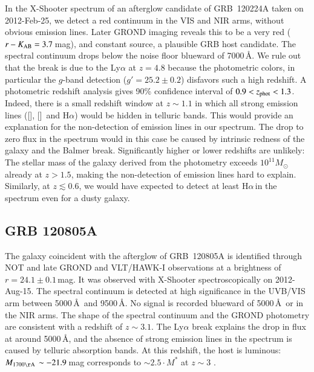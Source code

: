 \documentclass[traditabstract, longauth]{aa}
\newcommand{\ha}{H$\alpha$}
\newcommand{\oii}{[\ion{O}{ii}]}
\newcommand{\oiii}{[\ion{O}{iii}]}
\newcommand{\Msun}{$M_\odot$}
\begin{document}
\begin{appendix}
In the X-Shooter spectrum  \citep{2012GCN..12991...1W} of an afterglow candidate of GRB~120224A \citep{2012GCN..12980...1S} taken on 2012-Feb-25, we detect a red continuum in the VIS and NIR arms, without obvious emission lines. Later GROND imaging reveals this to be a very red ($r-K_{\rm{AB}}=3.7$\,mag), and constant source, a plausible GRB host candidate. The spectral continuum drops below the noise floor blueward of 7000\,\AA. We rule out that the break is due to the Ly$\alpha$ at $z=4.8$ because the photometric colors, in particular the $g$-band detection ($g'=25.2\pm0.2$) disfavors such a high redshift. A photometric redshift analysis gives 90\% confidence interval of $0.9 < z_{\rm{phot}} < 1.3$. Indeed, there is a small redshift window at $z\sim1.1$ in which all strong emission lines (\oii, \oiii\, and \ha) would be hidden in telluric bands. This would provide an explanation for the non-detection of emission lines in our spectrum. The drop to zero flux in the spectrum would in this case be caused by intrinsic redness of the galaxy and the Balmer break. Significantly higher or lower redshifts are unlikely: The stellar mass of the galaxy derived from the photometry exceeds $10^{11}$\Msun\,already at $z > 1.5$, making the non-detection of emission lines hard to explain. Similarly, at $z \lesssim 0.6$, we would have expected to detect at least \ha\,in the spectrum even for a dusty galaxy.

\subsection{GRB 120805A}

The galaxy coincident with the afterglow \citep{2012GCN..13651...1G, 2012GCN..13591...1G} of GRB~120805A \citep{2012GCN..13588...1T} is identified through NOT \citep{2012GCN..13639...1M} and late GROND and VLT/HAWK-I observations at a brightness of $r=24.1\pm0.1$\,mag. It was observed with X-Shooter spectroscopically on 2012-Aug-15. The spectral continuum is detected at high significance in the UVB/VIS arm between 5000\,\AA\, and 9500\,\AA. No signal is recorded blueward of 5000\,\AA\, or in the NIR arms. The shape of the spectral continuum and the GROND photometry are consistent with a redshift of $z\sim3.1$. The Ly$\alpha$ break explains the drop in flux at around 5000\,\AA, and the absence of strong emission lines in the spectrum is caused by telluric absorption bands. At this redshift, the host is luminous: $M_{\rm1700\AA\,}\sim-21.9$\,mag corresponds to $\sim2.5\cdot M^{*}$ at $z\sim3$ \citep[e.g.,][]{2009ApJ...692..778R}.


\end{appendix}
\end{document}
